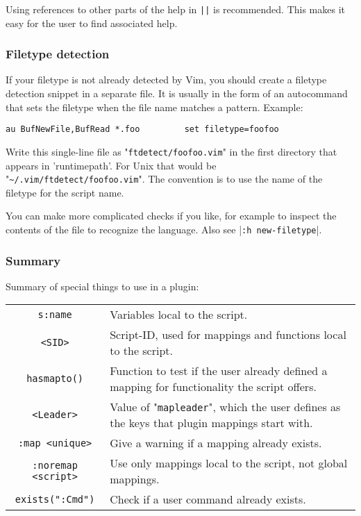 Using references to other parts of the help in \verb!||! is recommended.
This makes it easy for the user to find associated help.
\subsubsection{Filetype detection}
\label{plugin-filetype}
If your filetype is not already detected by Vim, you should create a filetype detection snippet in a separate file.
It is usually in the form of an autocommand that sets the filetype when the file name matches a pattern.
Example:

\begin{Verbatim}[samepage=true]
 au BufNewFile,BufRead *.foo         set filetype=foofoo
\end{Verbatim}

Write this single-line file as "\verb!ftdetect/foofoo.vim!" in the first directory that appears in 'runtimepath'.
For Unix that would be "\verb!~/.vim/ftdetect/foofoo.vim!".
The convention is to use the name of the filetype for the script name.

You can make more complicated checks if you like, for example to inspect the contents of the file to recognize the language.
Also see |\verb!:h new-filetype!|.
\subsubsection{Summary}
\label{plugin-special}

Summary of special things to use in a plugin:
\begin{center} \begin{tabularx}{\textwidth}{c l}
				\texttt{s:name} & Variables local to the script. \\
				\texttt{<SID>} & Script-ID, used for mappings and functions local to the script. \\
				\texttt{hasmapto()} & Function to test if the user already defined a mapping for functionality the script offers. \\
				\texttt{<Leader>} & Value of "\texttt{mapleader}", which the user defines as the keys that plugin mappings start with. \\
				\texttt{:map <unique>} & Give a warning if a mapping already exists. \\
				\texttt{:noremap <script>} & Use only mappings local to the script, not global mappings. \\
				\texttt{exists(":Cmd")} & Check if a user command already exists. \\
\end{tabularx} \end{center}
